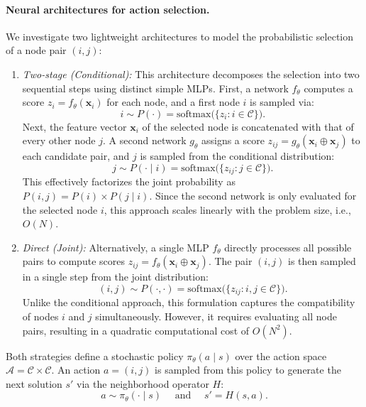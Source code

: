\documentclass[letterpaper]{article} %
\begin{document}
\paragraph{Neural architectures for action selection.}
\label{par:neural_architectures}
We investigate two lightweight architectures to model the probabilistic selection of a node pair $(i, j)$:

\begin{enumerate}
    \item \textit{Two-stage (Conditional):} 
    This architecture decomposes the selection into two sequential steps using distinct simple MLPs. First, a network $f_{\theta}$ computes a score $z_i = f_{\theta}(\mathbf{x}_i)$ for each node, and a first node $i$ is sampled via:
    $$
    i \sim P(\cdot) = \mathrm{softmax} \big( \{ z_i : i \in \mathcal{C} \} \big).
    $$
    Next, the feature vector $\mathbf{x}_i$ of the selected node is concatenated with that of every other node $j$. A second network $g_{\theta}$ assigns a score $z_{ij} = g_{\theta}(\mathbf{x}_i \oplus \mathbf{x}_j)$ to each candidate pair, and $j$ is sampled from the conditional distribution:
    $$
    j \sim P(\cdot \mid i) = \mathrm{softmax} \big( \{ z_{ij} :  j \in \mathcal{C} \} \big).
    $$
    This effectively factorizes the joint probability as $P(i, j) = P(i) \times P(j \mid i)$. Since the second network is only evaluated for the selected node $i$, this approach scales linearly with the problem size, i.e., $O(N)$.
    \item \textit{Direct (Joint):} 
    Alternatively, a single MLP $f_{\theta}$ directly processes all possible pairs to compute scores $z_{ij} = f_{\theta}(\mathbf{x}_i \oplus \mathbf{x}_j)$. The pair $(i, j)$ is then sampled in a single step from the joint distribution:
    $$
    (i, j) \sim P(\cdot, \cdot) = \mathrm{softmax} \big( \{ z_{ij} : i,j \in \mathcal{C} \} \big).
    $$
    Unlike the conditional approach, this formulation captures the compatibility of nodes $i$ and $j$ simultaneously. However, it requires evaluating all node pairs, resulting in a quadratic computational cost of $O(N^2)$.
\end{enumerate}

Both strategies define a stochastic policy $\pi_\theta(a \mid s)$ over the action space $\mathcal{A} = \mathcal{C} \times \mathcal{C}$. An action $a = (i, j)$ is sampled from this policy to generate the next solution $s'$ via the neighborhood operator $H$:
\begin{equation}
    a \sim \pi_\theta(\cdot \mid s) \quad \text{ and } \quad s' = H(s, a). \label{eq:nhood_selection}
\end{equation}
\end{document}
